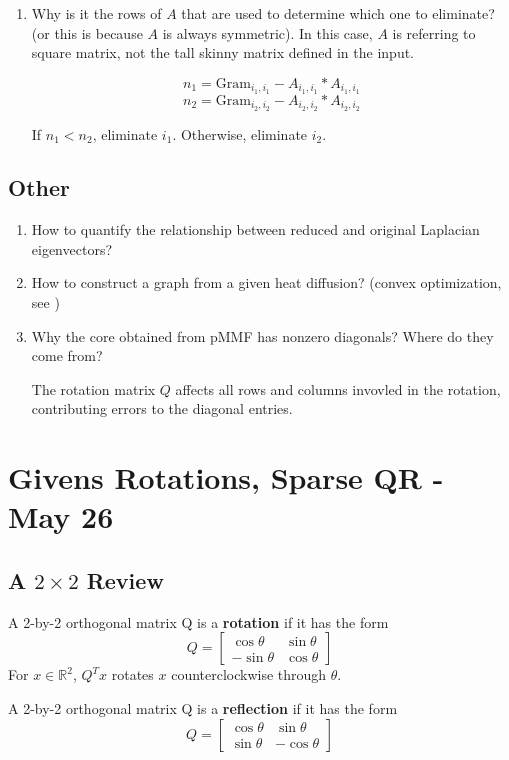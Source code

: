 \documentclass[a4paper]{article}
\newcommand{\R}{\mathbb{R}}
\newcommand{\Gram}{\text{Gram}}
\begin{document}
\begin{enumerate}
\begin{enumerate}
\item Why is it the rows of $A$ that are used to determine which one to eliminate? (or this is because $A$ is always symmetric). In this case, $A$ is referring to square matrix, not the tall skinny matrix defined in the input.

$$n_1 = \Gram_{i_1, i_1} - A_{i_1, i_1} * A_{i_1, i_1}$$
$$n_2 = \Gram_{i_2, i_2} - A_{i_2, i_2} * A_{i_2, i_2}$$

If $n_1<n_2$, eliminate $i_1$. Otherwise, eliminate $i_2$.
\end{enumerate}



\end{enumerate}

\subsection{Other}
\begin{enumerate}
\item How to quantify the relationship between reduced and original Laplacian eigenvectors?
\item How to construct a graph from a given heat diffusion? (convex optimization, see \cite{Segarra})
\item Why the core obtained from pMMF has nonzero diagonals? Where do they come from?

The rotation matrix $Q$ affects all rows and columns invovled in the rotation, contributing errors to the diagonal entries. 


\end{enumerate}
\newpage
\section{Givens Rotations, Sparse QR - May 26}

\subsection{A $2\times 2$ Review}

A 2-by-2 orthogonal matrix Q is a \textbf{rotation} if it has the form 
\[
Q = \begin{bmatrix}
    \cos\theta & \sin\theta \\
    -\sin\theta & \cos\theta
\end{bmatrix}\]
For $x \in \R^2$, $Q^Tx$ rotates $x$ counterclockwise through $\theta$.

A 2-by-2 orthogonal matrix Q is a \textbf{reflection} if it has the form 
\[
Q = \begin{bmatrix}
    \cos\theta & \sin\theta \\
    \sin\theta & -\cos\theta
\end{bmatrix}\]
\end{document}
